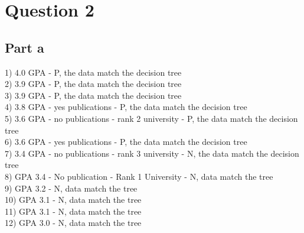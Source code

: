 \documentclass[12pt]{article}
\begin{document}
\section*{Question 2}

\subsection*{Part a}

1) 4.0 GPA - P, the data match the decision tree\\
2) 3.9 GPA - P, the data match the decision tree\\
3) 3.9 GPA - P, the data match the decision tree\\
4) 3.8 GPA - yes publications - P, the data match the decision tree\\
5) 3.6 GPA - no publications - rank 2 university - P, the data match the decision tree\\
6) 3.6 GPA - yes publications - P, the data match the decision tree\\
7) 3.4 GPA - no publications - rank 3 university - N, the data match the decision tree\\
8) GPA 3.4 - No publication - Rank 1 University - N, data match the tree\\
9) GPA 3.2 - N, data match the tree\\
10) GPA 3.1 - N, data match the tree\\
11) GPA 3.1 - N, data match the tree\\
12) GPA 3.0 - N, data match the tree\\
\end{document}
